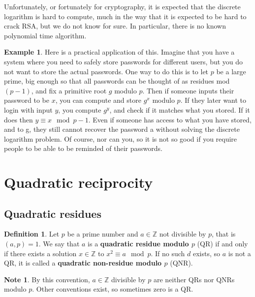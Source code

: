 \documentclass{article}
\newcommand{\Z}{\mathbb{Z}}
\newcommand{\rb}[1]{\left( #1 \right)}
\theoremstyle{definition}\newtheorem{definition}{Definition}
\theoremstyle{definition}\newtheorem*{remark}{Remark}
\theoremstyle{definition}\newtheorem*{example}{Example}
\theoremstyle{definition}\newtheorem*{note}{Note}
\begin{document}
Unfortunately, or fortunately for cryptography, it is expected that the discrete logarithm is hard to compute, much in the way that it is expected to be hard to crack RSA, but we do not know for sure. In particular, there is no known polynomial time algorithm.

\begin{example}
Here is a practical application of this. Imagine that you have a system where you need to safely store passwords for different users, but you do not want to store the actual passwords. One way to do this is to let $ p $ be a large prime, big enough so that all passwords can be thought of as residues mod $ \rb{p - 1} $, and fix a primitive root $ g $ modulo $ p $. Then if someone inputs their password to be $ x $, you can compute and store $ g^x $ modulo $ p $. If they later want to login with input $ y $, you compute $ g^y $, and check if it matches what you stored. If it does then $ y \equiv x \mod p - 1 $. Even if someone has access to what you have stored, and to g, they still cannot recover the password a without solving the discrete logarithm problem. Of
course, nor can you, so it is not so good if you require people to be able to
be reminded of their passwords.
\end{example}

\section{Quadratic reciprocity}

\subsection{Quadratic residues}

\begin{definition}
Let $ p $ be a prime number and $ a \in \Z $ not divisible by $ p $, that is $ \rb{a, p} = 1 $. We say that $ a $ is a \textbf{quadratic residue modulo $ p $} (QR) if and only if there exists a solution $ x \in \Z $ to $ x^2 \equiv a \mod p $. If no such $ d $ exists, so $ a $ is not a QR, it is called a \textbf{quadratic non-residue modulo $ p $} (QNR).
\end{definition}

\begin{note}
By this convention, $ a \in \Z $ divisible by $ p $ are neither QRs nor QNRs modulo $ p $. Other conventions exist, so sometimes zero is a QR.
\end{note}
\end{document}
